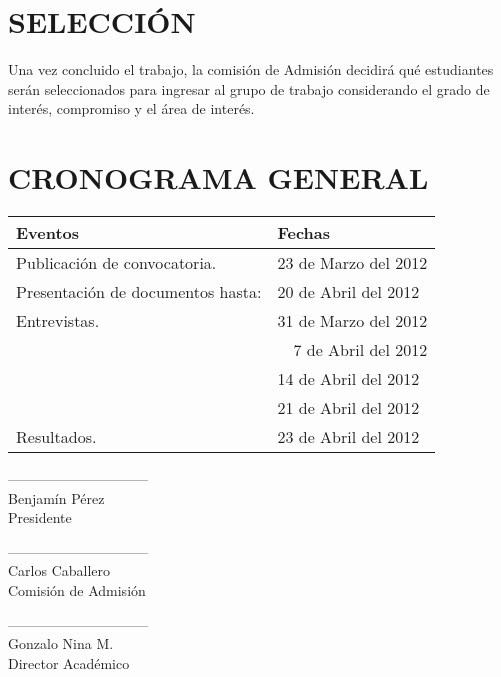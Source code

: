 \documentclass[11pt,letterpaper]{report}
\begin{document}
\section*{\bf \normalsize SELECCIÓN}
Una vez concluido el trabajo, la comisión de Admisión decidirá qué estudiantes serán seleccionados para ingresar al grupo de trabajo considerando el grado de interés, compromiso y el área  de interés.
\section*{\bf \normalsize CRONOGRAMA GENERAL}
\begin{center}
\begin{tabular}{|l|l|}
\hline
{\bf Eventos} & {\bf Fechas}\\
\hline
Publicación de convocatoria. & 23 de Marzo del 2012\\
\hline
Presentación de documentos hasta: & 20 de Abril del 2012\\
\hline
Entrevistas. & 31 de Marzo del 2012 \\
\hline
& ~~7 de Abril del 2012\\
\hline
& 14 de Abril del 2012\\
\hline
& 21 de Abril del 2012\\
\hline
Resultados. & 23 de Abril del 2012\\
\hline
\end{tabular}
\end{center}
 \vspace{2.3cm}
\begin{minipage}{0.26\textwidth}
\begin{center}
------------------------------\\
Benjamín Pérez\\
Presidente\\
\end{center}
\end{minipage}
\begin{minipage}{0.47\textwidth}
\begin{center}
------------------------------\\
Carlos Caballero\\
Comisión de Admisión
\end{center}
\end{minipage}
\begin{minipage}{0.26\textwidth}

\begin{center}
------------------------------\\
Gonzalo Nina M.\\
Director Académico\\
\end{center}
\end{minipage}
\end{document}
